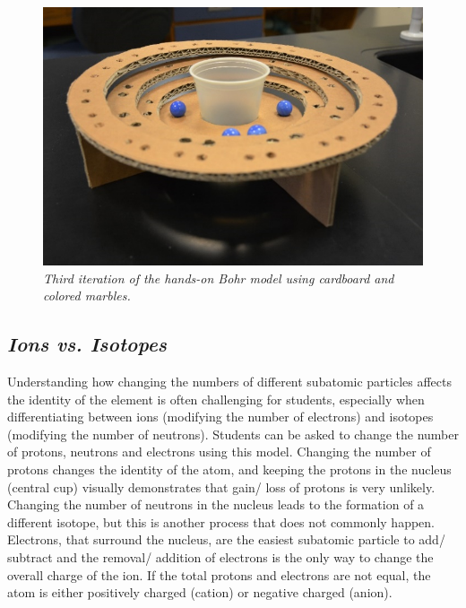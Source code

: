 \documentclass[11pt]{sig-alternate}
\begin{document}
\begin{large}
\begin{figure}[htp]
    \centering
    \includegraphics[width=\columnwidth]{figure 2.png}
    \captionsetup{font=large, labelfont=it}
    \caption{\textit{Third iteration of the hands-on Bohr model using cardboard and colored marbles.}}
    \label{Figure 2}
\end{figure}

\subsection*{\textit{Ions vs. Isotopes}}
Understanding how changing the numbers of different subatomic particles affects the identity of the element is often challenging for students, especially when differentiating between ions (modifying the number of electrons) and isotopes (modifying the number of neutrons). Students can be asked to change the number of protons, neutrons and electrons using this model. Changing the number of protons changes the identity of the atom, and keeping the protons in the nucleus (central cup) visually demonstrates that gain/ loss of protons is very unlikely. Changing the number of neutrons in the nucleus leads to the formation of a different isotope, but this is another process that does not commonly happen. Electrons, that surround the nucleus, are the easiest subatomic particle to add/ subtract and the removal/ addition of electrons is the only way to change the overall charge of the ion. If the total protons and electrons are not equal, the atom is either positively charged (cation) or negative charged (anion).


\end{large}
\end{document}
